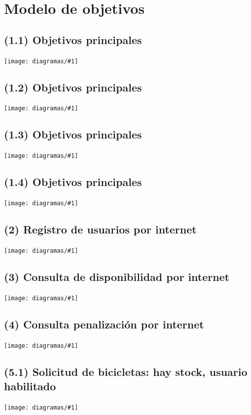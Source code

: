 \documentclass[a4paper, 10pt, twoside]{article}
\newcommand{\diagramav}[1]{
  \texttt{[image: diagramas/\#1]}
}
\newcommand{\diagramah}[1]{
  \texttt{[image: diagramas/\#1]}
}
\begin{document}


\section{Modelo de objetivos}

\subsection{(1.1)  Objetivos principales}
\diagramav{objetivos-1.1}

\subsection{(1.2)  Objetivos principales}
\diagramah{objetivos-1.2}

\subsection{(1.3)  Objetivos principales}
\diagramav{objetivos-1.3}

\subsection{(1.4)  Objetivos principales}
\diagramah{objetivos-1.4}

\subsection{(2)    Registro de usuarios por internet}
\diagramav{objetivos-2}

\subsection{(3)    Consulta de disponibilidad por internet}
\diagramav{objetivos-3}

\subsection{(4)    Consulta penalización por internet}
\diagramav{objetivos-4}

\subsection{(5.1)  Solicitud de bicicletas: hay stock, usuario habilitado}
\diagramav{objetivos-5.1}
\end{document}
